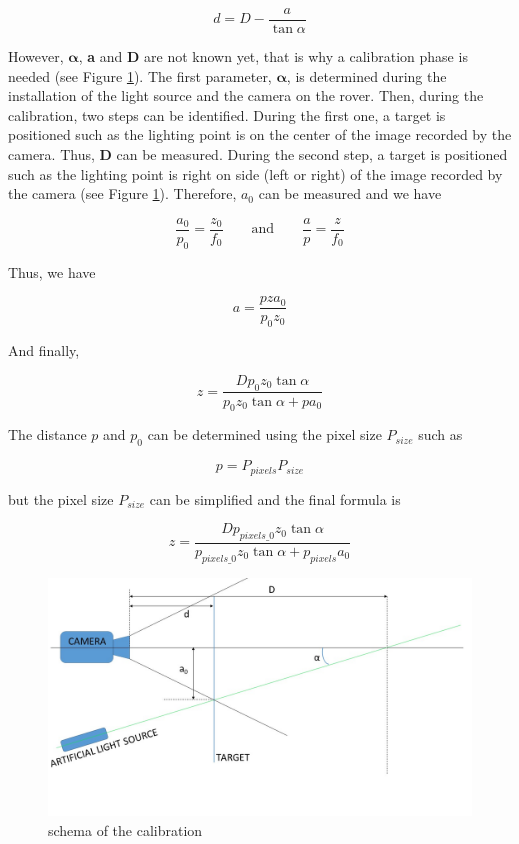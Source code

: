 \begin{equation*}
	d=D-\frac{a}{\tan \alpha}
\label{eq:formule_1D}
\end{equation*}


However, $\bm{\alpha}$, \textbf{a} and \textbf{D} are not known yet, that is why a calibration phase is needed (see Figure \ref{fig:calibration}). The first parameter, $\bm{\alpha}$, is determined during the installation of the light source and the camera on the rover. Then, during the calibration, two steps can be identified. During the first one, a target is positioned such as the lighting point is on the center of the image recorded by the camera. Thus, \textbf{D} can be measured. During the second step, a target is positioned such as the lighting point is right on side (left or right) of the image recorded by the camera (see Figure \ref{fig:calibration}). Therefore, $a_0$ can be measured and we have

\begin{equation*}
	\frac{a_0}{p_0} = \frac{z_0}{f_0} \qquad \text{and} \qquad \frac{a}{p} = \frac{z}{f_0}
\end{equation*}

Thus, we have 

\begin{equation*}
	a = \frac{pza_0}{p_0z_0}
\end{equation*}

And finally, 

\begin{equation*}
	z = \frac{Dp_0z_0\tan\alpha}{p_0z_0\tan\alpha+pa_0}
\end{equation*}

The distance $p$ and $p_0$ can be determined using the pixel size $P_{size}$ such as

\begin{equation*}
	p = P_{pixels}P_{size}
\end{equation*}

but the pixel size $P_{size}$ can be simplified and the final formula is

\begin{equation*}
z = \frac{Dp_{pixels\_0}z_0\tan\alpha}{p_{pixels\_0}z_0\tan\alpha+p_{pixels}a_0}\end{equation*}


\begin{figure}[H]
  \centerline{\includegraphics[scale=0.4]{fig/calibration.jpg}}
  \caption{schema of the calibration}
  \label{fig:calibration}
\end{figure}


